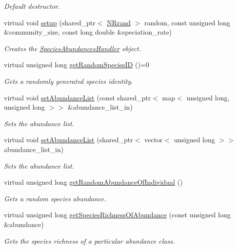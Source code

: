 \begin{DoxyCompactItemize}
\begin{DoxyCompactList}\small\item\em Default destructor. \end{DoxyCompactList}\item 
virtual void \hyperlink{class_species_abundances_handler_ad98b28d7d70e8e1281f0e9acb5b419fd}{setup} (shared\+\_\+ptr$<$ \hyperlink{class_n_rrand}{N\+Rrand} $>$ random, const unsigned long \&community\+\_\+size, const long double \&speciation\+\_\+rate)
\begin{DoxyCompactList}\small\item\em Creates the \hyperlink{class_species_abundances_handler}{Species\+Abundances\+Handler} object. \end{DoxyCompactList}\item 
virtual unsigned long \hyperlink{class_species_abundances_handler_ac44cbc9b3affa109c51f94b050653fea}{get\+Random\+Species\+ID} ()=0
\begin{DoxyCompactList}\small\item\em Gets a randomly generated species identity. \end{DoxyCompactList}\item 
virtual void \hyperlink{class_species_abundances_handler_a4c0a67df18c6af25463044796abd77d5}{set\+Abundance\+List} (const shared\+\_\+ptr$<$ map$<$ unsigned long, unsigned long $>$$>$ \&abundance\+\_\+list\+\_\+in)
\begin{DoxyCompactList}\small\item\em Sets the abundance list. \end{DoxyCompactList}\item 
virtual void \hyperlink{class_species_abundances_handler_ae838648ecd291e74309a6b32634dc776}{set\+Abundance\+List} (shared\+\_\+ptr$<$ vector$<$ unsigned long $>$$>$ abundance\+\_\+list\+\_\+in)
\begin{DoxyCompactList}\small\item\em Sets the abundance list. \end{DoxyCompactList}\item 
virtual unsigned long \hyperlink{class_species_abundances_handler_a5bd4781276f15255431a00863d182cba}{get\+Random\+Abundance\+Of\+Individual} ()
\begin{DoxyCompactList}\small\item\em Gets a random species abundance. \end{DoxyCompactList}\item 
virtual unsigned long \hyperlink{class_species_abundances_handler_a33708e99d7eb07385aea58aea925e1bc}{get\+Species\+Richness\+Of\+Abundance} (const unsigned long \&abundance)
\begin{DoxyCompactList}\small\item\em Gets the species richness of a particular abundance class. \end{DoxyCompactList}\end{DoxyCompactItemize}

